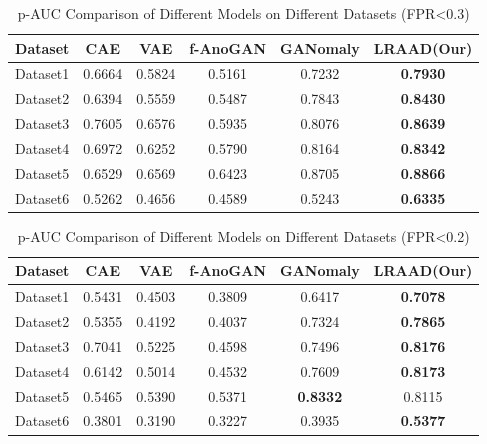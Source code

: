 \documentclass{article}
\begin{document}
\begin{table}[H]
    \centering
    \begin{tabular}{cccccc}
        \toprule
        Dataset & CAE & VAE & f-AnoGAN & GANomaly & LRAAD(Our) \\
        \midrule
        Dataset1 & 0.6664 & 0.5824 & 0.5161 & 0.7232 & \textbf{0.7930} \\
        Dataset2 & 0.6394 & 0.5559 & 0.5487 & 0.7843 & \textbf{0.8430} \\
        Dataset3 & 0.7605 & 0.6576 & 0.5935 & 0.8076 & \textbf{0.8639} \\
        Dataset4 & 0.6972 & 0.6252 & 0.5790 & 0.8164 & \textbf{0.8342} \\
        Dataset5 & 0.6529 & 0.6569 & 0.6423 & 0.8705 & \textbf{0.8866} \\
        Dataset6 & 0.5262 & 0.4656 & 0.4589 & 0.5243 & \textbf{0.6335} \\
        \bottomrule
    \end{tabular}
    \caption{p-AUC Comparison of Different Models on Different Datasets (FPR<0.3)}
    \label{tab:p-auc-03}
\end{table}

\begin{table}[H]
    \centering
    \begin{tabular}{cccccc}
        \toprule
        Dataset & CAE & VAE & f-AnoGAN & GANomaly & LRAAD(Our) \\
        \midrule
        Dataset1 & 0.5431 & 0.4503 & 0.3809 & 0.6417 & \textbf{0.7078} \\
        Dataset2 & 0.5355 & 0.4192 & 0.4037 & 0.7324 & \textbf{0.7865} \\
        Dataset3 & 0.7041 & 0.5225 & 0.4598 & 0.7496 & \textbf{0.8176} \\
        Dataset4 & 0.6142 & 0.5014 & 0.4532 & 0.7609 & \textbf{0.8173} \\
        Dataset5 & 0.5465 & 0.5390 & 0.5371 & \textbf{0.8332} & 0.8115 \\
        Dataset6 & 0.3801 & 0.3190 & 0.3227 & 0.3935 & \textbf{0.5377} \\

        \bottomrule
    \end{tabular}
    \caption{p-AUC Comparison of Different Models on Different Datasets (FPR<0.2)}
    \label{tab:p-auc-02}
\end{table}
\end{document}
